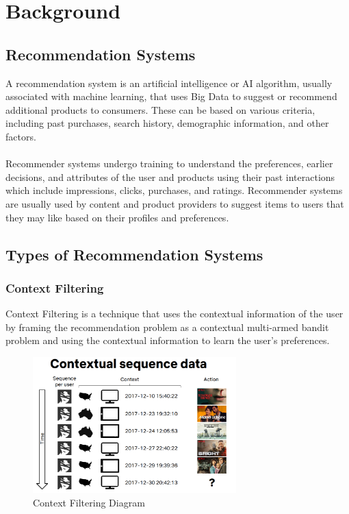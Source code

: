 \chapter{Background}
\minitoc

\section{Recommendation Systems}\label{sec:recommendation-systems}
A recommendation system is an artificial intelligence or AI algorithm, usually associated with machine learning, that uses Big Data to suggest or recommend additional products to consumers. These can be based on various criteria, including past purchases, search history, demographic information, and other factors. \cite{NvidiaRecSys} \\ \\
Recommender systems undergo training to understand the preferences, earlier decisions, and attributes of the user and products using their past interactions which include impressions, clicks, purchases, and ratings. Recommender systems are usually used by content and product providers to suggest items to users that they may like based on their profiles and preferences. 

\section{Types of Recommendation Systems}\label{sec:types-of-recommendation-systems}

\subsection{Context Filtering}
Context Filtering is a technique that uses the contextual information of the user by framing the recommendation problem as a contextual multi-armed bandit problem and using the contextual information to learn the user's preferences.
\begin{figure}[H]
    \centering
    \includegraphics[width=0.7\textwidth]{assets/contextual-sequence-prediction.png}
    \caption[Context Filtering Diagram]{Context Filtering Diagram \cite{NvidiaRecSys}} 
\end{figure}
